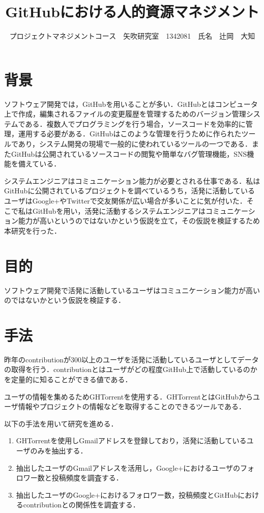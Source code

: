 \documentclass[uplatex,twocolumn,dvipdfmx]{jsarticle}
\title{\vspace{-5mm}\fontsize{14pt}{0pt}\selectfont GitHubにおける人的資源マネジメント}
\author{\normalsize プロジェクトマネジメントコース　矢吹研究室　1342081　氏名　辻岡　大知}
\date{}
\begin{document}
\fontsize{10.5pt}{\baselineskip}\selectfont
\maketitle





\section{背景}

ソフトウェア開発では，GitHubを用いることが多い．GitHubとはコンピュータ上で作成，編集されるファイルの変更履歴を管理するためのバージョン管理システムである．複数人でプログラミングを行う場合，ソースコードを効率的に管理，運用する必要がある．GitHubはこのような管理を行うために作られたツールであり，システム開発の現場で一般的に使われているツールの一つである\cite{a}．またGitHubは公開されているソースコードの閲覧や簡単なバグ管理機能，SNS機能を備えている．

システムエンジニアはコミュニケーション能力が必要とされる仕事である．私はGitHubに公開されているプロジェクトを調べているうち，活発に活動しているユーザはGoogle+やTwitterで交友関係が広い場合が多いことに気が付いた．そこで私はGitHubを用い，活発に活動するシステムエンジニアはコミュニケーション能力が高いというのではないかという仮説を立て，その仮説を検証するため本研究を行った．


\section{目的}

ソフトウェア開発で活発に活動しているユーザはコミュニケーション能力が高いのではないかという仮説を検証する．

\section{手法}

昨年のcontributionが300以上のユーザを活発に活動しているユーザとしてデータの取得を行う．contributionとはユーザがどの程度GitHub上で活動しているのかを定量的に知ることができる値である．

ユーザの情報を集めるためGHTorrentを使用する．GHTorrentとはGitHubからユーザ情報やプロジェクトの情報などを取得することのできるツールである．

以下の手法を用いて研究を進める．

\begin{enumerate}
 \item GHTorrent\cite{GHTorrent}を使用しGmailアドレスを登録しており，活発に活動しているユーザのみを抽出する．
 \item 抽出したユーザのGmailアドレスを活用し，Google+におけるユーザのフォロワー数と投稿頻度を調査する．
 \item 抽出したユーザのGoogle+におけるフォロワー数，投稿頻度とGitHubにおけるcontributionとの関係性を調査する．
\end{enumerate}
\end{document}
